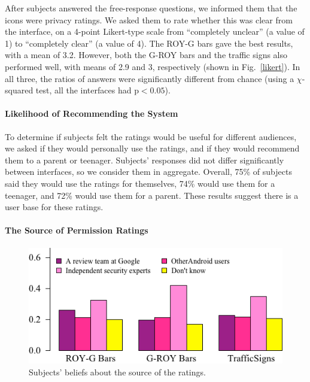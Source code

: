 \documentclass[11pt]{article}
\begin{document}
After subjects answered the free-response questions, we informed them that 
the icons were privacy ratings. We asked them to rate whether this was 
clear from the interface, on a 4-point Likert-type scale from ``completely 
unclear'' (a value of 1) to ``completely clear'' (a value of 4).
The ROY-G bars gave the best results, with a mean of 3.2.
However, both the G-ROY bars and the traffic signs also performed well,
with means of 2.9 and 3, respectively (shown in Fig.~\ref{likert}). 
In all three, the ratios of answers were 
significantly different from chance (using a $\chi$-squared test, all the interfaces had 
$\mathrm{p}< 0.05$).

\paragraph{Likelihood of Recommending the System}
\label{ssec-est-usage}

To determine if subjects felt the ratings would be useful for 
different audiences, we asked if 
they would personally use the ratings, and if
they would recommend them to a parent or
teenager. Subjects' responses did not 
differ significantly between interfaces, so we consider 
them in aggregate. Overall, 75\% of subjects said they would use the
ratings for themselves, 
74\% would use them for a teenager, and 72\% would use them for a parent. 
These results suggest there is a user base for these ratings.

\paragraph{The Source of Permission Ratings}
\label{s-source}

\begin{figure}
\begin{center}
\includegraphics[width=.9\linewidth]{graphs/SourceBeliefs.png}
    \caption{Subjects' beliefs about the source of the ratings.}
    \label{src-beliefs}
    \end{center}
\end{figure}
\end{document}
